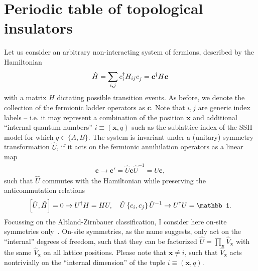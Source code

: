 \section{Periodic table of topological insulators}
\label{sec:Periodic_table_of_topological_insulators}
%
%
Let us consider an arbitrary non-interacting system of fermions, described by the Hamiltonian
\begin{align}
    \hat H = \sum_{i,j}c^\dag_{i}H_{ij}c^\pdag_j = {\bm c}^\dag H {\bm c}^\pdag
\end{align}
with a matrix $H$ dictating possible transition events.
As before, we denote the collection of the fermionic ladder operators as $\bm c$.
Note that $i,j$ are generic index labels -- i.e. it may represent a combination of the position $\bm x$ and additional ``internal quantum numbers'' $i\equiv(\bm x,q)$ such as the sublattice index of the SSH model for which $q\in \{A,B\}$.
The system is invariant under a (unitary) symmetry transformation $\hat U$, if it acts on the fermionic annihilation operators as a linear map
\begin{align}
    {\bm c}\rightarrow {\bm c}' = \hat U {\bm c} \hat U^{-1} = U {\bm c},
\end{align}
such that $\hat U$ commutes with the Hamiltonian while preserving the anticommutation relations
\begin{align}
    \commutator{\hat U,\hat H} = 0
    \rightarrow
    U^\dag H = H U
    ,
    \quad
    \hat U\anticommutator{c_i,c_j}\hat U^{-1}
    \rightarrow
    U^\dag U = \mathbb1.
\end{align}
Focussing on the Altland-Zirnbauer classification, I consider here on-site symmetries only~\cite{Altland1997}.
On-site symmetries, as the name suggests, only act on the ``internal'' degrees of freedom, such that they can be factorized $\hat U=\prod_{\bm x}\hat V_{\bm x}$ with the same $\hat V_{\bm x}$ on all lattice positions.
Please note that ${\bm x}\neq i$, such that $\hat V_{\bm x}$ acts nontrivially on the ``internal dimension'' of the tuple $i\equiv({\bm x},q)$.


